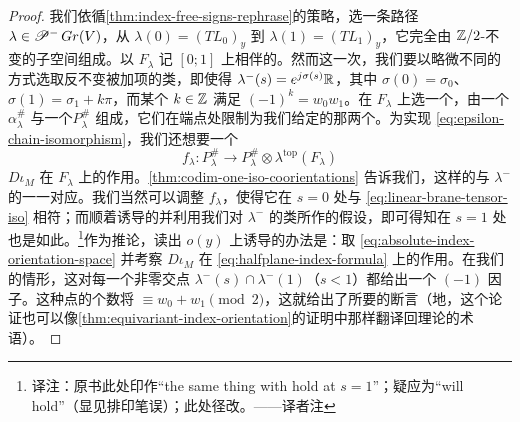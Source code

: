 \begin{proof}
我们依循\cref{thm:index-free-signs-rephrase}的策略，选一条路径 $\lambda\in\mathscr{P}^-\,Gr(V)$，从 $\lambda(0)=(TL_0)_y$ 到 $\lambda(1)=(TL_1)_y$，它完全由 $\mathbb{Z}/2$-不变的\trLagrange{}子空间组成。以 $F_\lambda$ 记 $[0;1]$ 上相伴的\trVectorBundle{}。然而这一次，我们要以略微不同的方式选取反不变被加项的\trHomotopy{}类，即使得 $\lambda^-(s)=e^{j\sigma(s)}\mathbb{R}$，其中 $\sigma(0)=\sigma_0$、$\sigma(1)=\sigma_1+k\pi$，而某个 $k\in\mathbb{Z}$ 满足 $(-1)^k=w_0w_1$。在 $F_\lambda$ 上选一个\trBraneStructure{}，由一个\trRealValuedPhase{}$\alpha_\lambda^{\#}$ 与一个\trPinStructure{}$P_\lambda^{\#}$ 组成，它们在端点处限制为我们给定的那两个\trLinear\trLagrange\trBrane{}。为实现 \eqref{eq:epsilon-chain-isomorphism}，我们还想要一个\trIsomorphism
\begin{equation*}
f_\lambda\colon P_\lambda^{\#}\longrightarrow P_\lambda^{\#}\otimes\lambda^{\mathrm{top}}(F_\lambda)
\end{equation*}
\trCovering{}$D\iota_M$ 在 $F_\lambda$ 上的作用。\cref{thm:codim-one-iso-coorientations} 告诉我们，这样的\trIsomorphism{}与 $\lambda^-$ 的\trOrientation{}一一对应。我们当然可以调整 $f_\lambda$，使得它在 $s=0$ 处与 \eqref{eq:linear-brane-tensor-iso} 相符；而顺着诱导的\trOrientation{}并利用我们对 $\lambda^-$ 的\trHomotopy{}类所作的假设，即可得知在 $s=1$ 处也是如此。\footnote{译注：原书此处印作“the same thing with hold at $s=1$”；疑应为“will hold”（显见排印笔误）；此处径改。——译者注}作为推论，读出 $o(y)$ 上诱导\trAutomorphism{}的办法是：取 \eqref{eq:absolute-index-orientation-space} 并考察 $D\iota_M$ 在 \eqref{eq:halfplane-index-formula} 上的作用。在我们的情形，这对每一个非零交点 $\lambda^-(s)\cap\lambda^-(1)$（$s<1$）都给出一个 $(-1)$ 因子。这种点的个数将 $\equiv w_0+w_1\pmod{2}$，这就给出了所要的断言（\trEquivalence{}地，这个论证也可以像\cref{thm:equivariant-index-orientation}的证明中那样翻译回\trIndex{}理论的术语）。
\end{proof}
